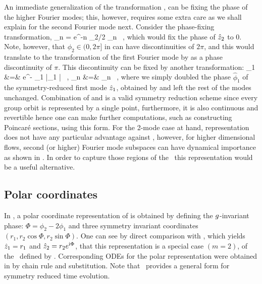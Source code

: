An immediate generalization of the transformation ,
can be fixing the phase of the higher Fourier modes; this, however, requires
some extra care as we shall explain for the second Fourier mode next.
Consider the phase-fixing transformation,
\beq
	\sspRedC_n = e^{-\ii n \phi_2/2} \sspC_n \, ,
	\label{e-2ndmodeTransform}
\eeq
which would fix the phase of $\hat{z}_2$ to $0$. Note, however, that
$\phi_2 \in (0, 2 \pi]$ in can have discontinuities of $2 \pi$, and this
would translate to the transformation of the first Fourier mode by 
as a phase discontinuity of $\pi$. This discontinuity can be fixed by another
transformation:
\bea
	\tilde{\sspC}_1 &=& e^{- \hat{\phi}_1} |\sspRedC_1 | \, , \continue
	\tilde{\sspC}_{n } &=& \sspRedC_n \, ,
	\label{e-PhaseDoubling}
\eea
where we simply doubled the phase $\hat{\phi}_1$ of the symmetry-reduced
first mode $\hat{z}_1$, obtained by  and left
the rest of the modes unchanged. Combination of 
and  is a valid symmetry reduction scheme since every
group orbit is represented by a single point, furthermore, it is also continuous
and revertible hence one can make further computations, such as constructing
Poincar\'{e} sections, using this form. For the 2-mode case at hand, representation
 does not have any particular advantage against
, however, for higher dimensional flows, second
(or higher) Fourier mode subspaces can have dynamical importance as shown in
. In order to capture those regions of the \statesp\ this
representation would be a useful alternative.

\subsection{Polar coordinates}
\label{s-polar}

In , a polar coordinate representation of 
is obtained by defining the $g$-invariant phase: $\Phi = \phi_2 - 2 \phi_1$
and three symmetry invariant coordinates $(r_1, r_2 \cos \Phi, r_2 \sin \Phi)$.
One can see by direct comparison with , which
yields $\hat{z}_1 = r_1$ and $\hat{z}_2 = r_2 e^{\mathrm{i} \Phi}$, that this
representation is a special case $(m=2)$, of the \slice\ defined by
. Corresponding ODEs for the polar representation
were obtained in  by  chain rule and substitution. Note
that \mslices\ provides a general form  for symmetry
reduced time evolution.

